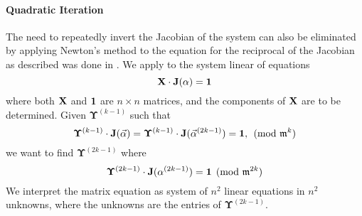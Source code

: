 \paragraph{Quadratic Iteration}

The need to repeatedly invert the Jacobian of the system can also be 
eliminated by applying Newton's method to the equation for the reciprocal 
of the Jacobian as described was done in
.
We apply  to the system linear of equations
\[
\mathbf{X} \cdot \mathbf{J}(\alpha) = {\bf 1}
\]
where both $\bf X$ and $\bf 1$ are $n\times n$ matrices, and the
components of $\bf X$ are to be determined.  Given
$\mathbf{\Upsilon}^{(k-1)}$ such that 
\[
\mathbf{\Upsilon}^{(k-1)} \cdot \mathbf{J}(\vec{\alpha}) = 
\mathbf{\Upsilon}^{(k-1)} \cdot \mathbf{J}(\vec{\alpha}^{(2k-1)}) = {\bf 1},
  \pmod{\mathfrak{m}^{k}}
\]
we want to find $\mathbf{\Upsilon}^{(2k-1)}$ where
\begin{equation} \label{Jacobian:1:Eq}
\mathbf{\Upsilon}^{(2k-1)} \cdot \mathbf{J}(\alpha^{(2k-1)}) = {\bf 1} \pmod{\mathfrak{m}^{2k}}
\end{equation}
We interpret the matrix equation  as system of 
$n^{2}$ linear equations in $n^{2}$ unknowns, where the unknowns are the 
entries of $\mathbf{\Upsilon}^{(2k-1)}$. 

